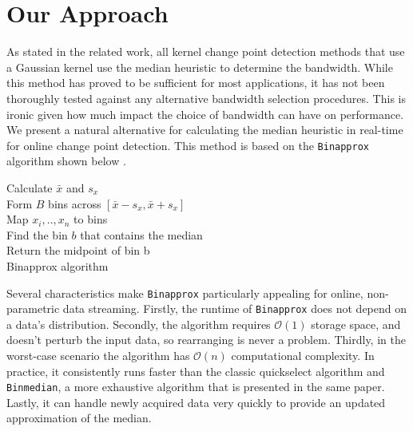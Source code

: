 
\section{Our Approach}
\label{our_approach}

As stated in the related work, all kernel change point detection methods that use a Gaussian kernel use the median heuristic to determine the bandwidth. While this method has proved to be sufficient for most applications, it has not been thoroughly tested against any alternative bandwidth selection procedures. This is ironic given how much impact the choice of bandwidth can have on performance. We present a natural alternative for calculating the median heuristic in real-time for online change point detection. This method is based on the \texttt{Binapprox} algorithm shown below \cite{tibshirani2008fast}. 

\begin{algorithm}[H]
\SetAlgoLined
{}
Calculate $\bar{x}$ and $s_x$\\
Form $B$ bins across $[\bar{x} - s_x, \bar{x} + s_x]$\\
Map $x_i,..,x_n$ to bins\\
Find the bin $b$ that contains the median\\
Return the midpoint of bin b\\
 \caption{Binapprox algorithm}
\end{algorithm}

Several characteristics make \texttt{Binapprox} particularly appealing for online, non-parametric data streaming.  Firstly,
the runtime of \texttt{Binapprox} does not depend on a data's distribution. Secondly, the algorithm requires $\mathcal{O}(1)$ storage space, and doesn't perturb the input data, so rearranging is never a problem. Thirdly, in the worst-case scenario the algorithm has $\mathcal{O}(n)$ computational complexity. In practice, it consistently runs faster than the classic quickselect algorithm and \texttt{Binmedian}, a more exhaustive  algorithm that is presented in the same paper. Lastly, it can handle newly acquired data very quickly to provide an updated approximation of the median. 


